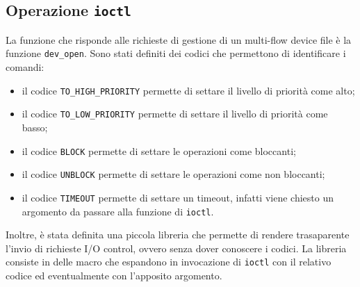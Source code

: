 \documentclass[oneside]{article}
\begin{document}
\subsection{Operazione \texttt{ioctl}}
La funzione che risponde alle richieste di gestione di un multi-flow device file è la funzione \texttt{dev\_open}. Sono stati definiti dei codici che permettono di identificare i comandi:
\begin{itemize}
\item il codice \texttt{TO\_HIGH\_PRIORITY} permette di settare il livello di priorità come alto;
\item il codice \texttt{TO\_LOW\_PRIORITY} permette di settare il livello di priorità come basso;
\item il codice \texttt{BLOCK} permette di settare le operazioni come bloccanti;
\item il codice \texttt{UNBLOCK} permette di settare le operazioni come non bloccanti;
\item il codice \texttt{TIMEOUT} permette di settare un timeout, infatti viene chiesto un argomento da passare alla funzione di \texttt{ioctl}.
\end{itemize}

Inoltre, è stata definita una piccola libreria che permette di rendere trasaparente l'invio di richieste I/O control, ovvero senza dover conoscere i codici. La libreria consiste in delle macro che espandono in invocazione di \texttt{ioctl} con il relativo codice ed eventualmente con l'apposito argomento.
\end{document}
